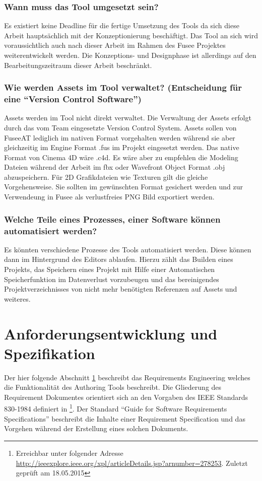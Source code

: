 \documentclass[pagesize, paper=a4, fontsize=12pt, titlepage=true, headings=small, headnosepline, abstractoff, liststotoc, nochapterprefix, plainheadsepline, twoside]{scrreprt}
\begin{document}
\subsubsection{Wann muss das Tool umgesetzt sein?}
Es existiert keine Deadline für die fertige Umsetzung des Tools da sich diese Arbeit hauptsächlich mit der Konzeptionierung beschäftigt. Das Tool an sich wird voraussichtlich auch nach dieser Arbeit im Rahmen des Fusee Projektes weiterentwickelt werden. Die Konzeptions- und Designphase ist allerdings auf den Bearbeitungszeitraum dieser Arbeit beschränkt.

\subsubsection{Wie werden Assets im Tool verwaltet? (Entscheidung für eine “Version Control Software”)}
Assets werden im Tool nicht direkt verwaltet. Die Verwaltung der Assets erfolgt durch das vom Team eingesetzte Version Control System. Assets sollen von FuseeAT lediglich im nativen Format vorgehalten werden während sie aber gleichzeitig im Engine Format .fus im Projekt eingesetzt werden. Das native Format von Cinema 4D wäre .c4d. Es wäre aber zu empfehlen die Modeling Dateien während der Arbeit im fbx oder Wavefront Object Format .obj abzuspeichern. Für 2D Grafikdateien wie Texturen gilt die gleiche Vorgehensweise. Sie sollten im gewünschten Format gesichert werden und zur Verwendeung in Fusee als verlustfreies PNG Bild exportiert werden.

\subsubsection{Welche Teile eines Prozesses, einer Software können automatisiert werden?}
Es könnten verschiedene Prozesse des Tools automatisiert werden. Diese können dann im Hintergrund des Editors ablaufen. Hierzu zählt das Builden eines Projekts, das Speichern eines Projekt mit Hilfe einer Automatischen Speicherfunktion im Datenverlust vorzubeugen und das bereinigendes Projektverzeichnisses von nicht mehr benötigten Referenzen auf Assets und weiteres.


\section{Anforderungsentwicklung und Spezifikation}\label{sec:RAD}
Der hier folgende Abschnitt \ref{sec:RAD} beschreibt das Requirements Engineering welches die Funktionalität des Authoring Tools beschreibt. Die Gliederung des Requirement Dokumentes orientiert sich an den Vorgaben des IEEE Standards 830-1984 definiert in \footnote{Erreichbar unter folgender Adresse \url{http://ieeexplore.ieee.org/xpl/articleDetails.jsp?arnumber=278253}. Zuletzt geprüft am 18.05.2015}. Der Standard “Guide for Software Requirements Specifications” beschreibt die Inhalte einer Requirement Specification und das Vorgehen während der Erstellung eines solchen Dokuments.
\end{document}
